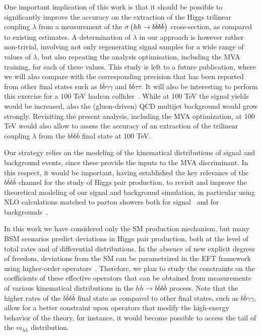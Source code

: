 One important implication of this work is that it should
be possible to significantly
improve  the accuracy on the extraction of
the Higgs trilinear coupling $\lambda$ from
a measurement of the
$\sigma\left( hh\to b\bar{b}b\bar{b}\right)$ cross-section, as compared
to existing estimates.
%
A determination of $\lambda$ in our approach is however
rather
non-trivial, involving
 not only regenerating signal samples
 for a wide range of values of  $\lambda$, but also
 repeating the analysis
optimisation, including the MVA training, for each
of these values.
%
This study is left to a future
publication, where we will also
compare with the corresponding  precision 
that has been reported from other final states such as
 $b\bar{b}\gamma\gamma$
and $b\bar{b}\tau\tau$.
%
It will also be  interesting to perform
this exercise for a 100 TeV hadron collider~\cite{Barr:2014sga,
  Azatov:2015oxa,Papaefstathiou:2015iba,
  Arkani-Hamed:2015vfh}.
%
While at 100 TeV the
signal yields would be increased, also the (gluon-driven) QCD
multijet background would grow strongly.
%
Revisiting
the present analysis, including the MVA optimization,
at 100 TeV would also allow
to assess the accuracy of an extraction of the trilinear
coupling $\lambda$ from the $b\bar{b}b\bar{b}$ final state
at 100 TeV.


Our strategy relies on the modeling of the kinematical
distributions of signal and background events, since these provide
the inputs to the MVA discriminant.
%
In this respect, it would be important, having established the key
relevance of the $b\bar{b}b\bar{b}$ channel for the study of
Higgs pair production, to revisit and improve the
theoretical modeling of our signal and background simulation,
in particular using NLO calculations matched to
parton showers both for signal~\cite{Frederix:2014hta,Maierhofer:2013sha}
and for backgrounds~\cite{Alwall:2014hca,Gleisberg:2008ta}.
%

In this work we have considered only the SM production mechanism,
but many BSM scenarios predict deviations
in Higgs pair production, both at the level of total rates
and of
differential distributions.
%
In the absence of new explicit degrees of freedom,
deviations from the SM can be parametrized in
the EFT framework using higher-order
operators~\cite{Azatov:2015oxa,Goertz:2014qta}.
%
Therefore, we plan to study the constraints
on the coefficients of these effective
operators that can be obtained from measurements
of various kinematical distributions
in the $hh\to b\bar{b}b\bar{b}$ process.
%
Note that the higher rates of the $b\bar{b}b\bar{b}$ final state as compared to
other final states, such as
$b\bar{b}\gamma\gamma$, allow for a better constraint upon operators
that modify the high-energy behavior
of the theory, for instance,
it would become possible
to access the tail of the $m_{hh}$ distribution.


